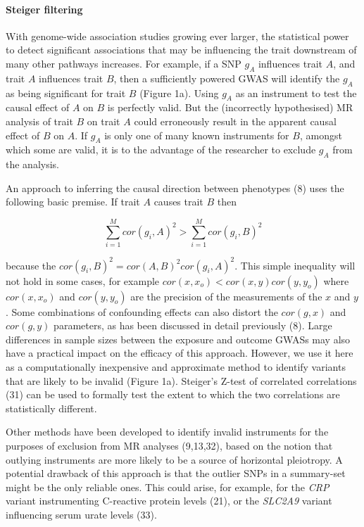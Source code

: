 \documentclass[]{article}
\let\oldparagraph\paragraph
\renewcommand{\paragraph}[1]{\oldparagraph{#1}\mbox{}}
\begin{document}
\paragraph{Steiger filtering}\label{steiger-filtering}

With genome-wide association studies growing ever larger, the
statistical power to detect significant associations that may be
influencing the trait downstream of many other pathways increases. For
example, if a SNP \(g_{A}\) influences trait \(A\), and trait \(A\)
influences trait \(B\), then a sufficiently powered GWAS will identify
the \(g_{A}\) as being significant for trait \(B\) (Figure 1a). Using
\(g_{A}\) as an instrument to test the causal effect of \(A\) on \(B\)
is perfectly valid. But the (incorrectly hypothesised) MR analysis of
trait \(B\) on trait \(A\) could erroneously result in the apparent
causal effect of \(B\) on \(A\). If \(g_{A}\) is only one of many known
instruments for \(B\), amongst which some are valid, it is to the
advantage of the researcher to exclude \(g_{A}\) from the analysis.

An approach to inferring the causal direction between phenotypes (8)
uses the following basic premise. If trait \(A\) causes trait \(B\) then

\[
\sum^M_{i=1}{cor(g_{i}, A)^2} > \sum^M_{i=1}{cor(g_{i}, B)^2}
\]

because the \(cor(g_{i}, B)^2 = cor(A, B)^{2} cor(g_{i}, A)^{2}\). This
simple inequality will not hold in some cases, for example
\(cor(x, x_o) < cor(x,y)cor(y,y_o)\) where \(cor(x, x_o)\) and
\(cor(y, y_o)\) are the precision of the measurements of the \(x\) and
\(y\). Some combinations of confounding effects can also distort the
\(cor(g,x)\) and \(cor(g,y)\) parameters, as has been discussed in
detail previously (8). Large differences in sample sizes between the
exposure and outcome GWASs may also have a practical impact on the
efficacy of this approach. However, we use it here as a computationally
inexpensive and approximate method to identify variants that are likely
to be invalid (Figure 1a). Steiger's Z-test of correlated correlations
(31) can be used to formally test the extent to which the two
correlations are statistically different.

Other methods have been developed to identify invalid instruments for
the purposes of exclusion from MR analyses (9,13,32), based on the
notion that outlying instruments are more likely to be a source of
horizontal pleiotropy. A potential drawback of this approach is that the
outlier SNPs in a summary-set might be the only reliable ones. This
could arise, for example, for the \emph{CRP} variant instrumenting
C-reactive protein levels (21), or the \emph{SLC2A9} variant influencing
serum urate levels (33).
\end{document}
